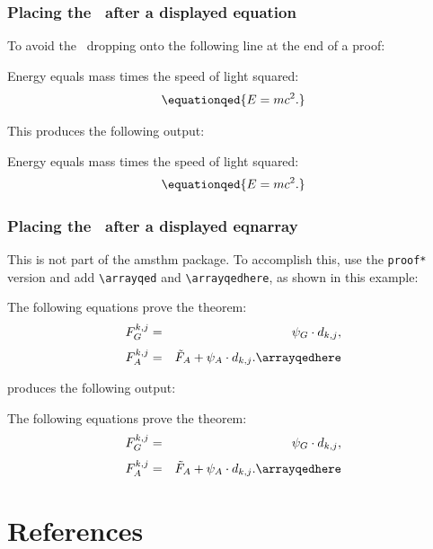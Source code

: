 \documentclass{cje}          %
\theoremstyle{plain}%
\theoremstyle{definition}
\theoremstyle{remark}
\begin{document}
\subsubsection{Placing the \qedsymbol\ after a displayed equation}

To avoid the \qedsymbol\ dropping onto the following line at the end of a proof:
\begin{smallverbatim}
\begin{proof*}
  Energy equals mass times the speed of light squared:
  \[
     \equationqed{E=mc^2.}
  \]
\end{proof*}
\end{smallverbatim}
This produces the following output:
\begin{proof*}
   Energy equals mass times the speed of light squared:
  \[
     \equationqed{E=mc^2.}
  \]
\end{proof*}

\subsubsection{Placing the \qedsymbol\ after a displayed eqnarray}

This is not part of the amsthm package. To accomplish this,  use the \verb"proof*" version and add \verb"\arrayqed" and \verb"\arrayqedhere", as shown in this example:
\begin{smallverbatim}
\begin{proof*}
  The following equations prove the theorem:
  \arrayqed
  \begin{eqnarray}
    F_G^{k,j} &=& \psi_G\cdot d_{k,j},\nonumber\\[3pt]
    F_A^{k,j} &=& \tilde F_A + \psi_A \cdot d_{k,j}.
  \arrayqedhere
  \end{eqnarray}
\end{proof*}
\end{smallverbatim}
produces the following output:
\begin{proof*}
  The following equations prove the theorem:
  \arrayqed
  \begin{eqnarray}
    F_G^{k,j} &=& \psi_G\cdot d_{k,j},\nonumber\\[3pt]
    F_A^{k,j} &=& \tilde F_A + \psi_A \cdot d_{k,j}.
  \arrayqedhere
  \end{eqnarray}
\end{proof*}

\section{References}
\end{document}
